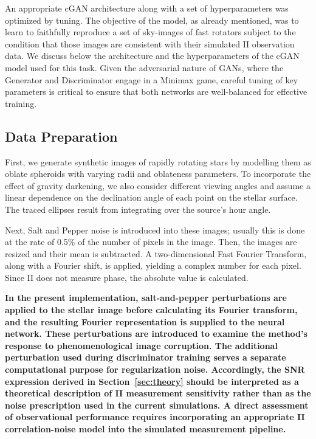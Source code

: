 An appropriate cGAN architecture along with a set of hyperparameters was optimized by tuning. The objective of the model, as already mentioned, was to learn to faithfully reproduce a set of sky-images of fast rotators subject to the condition that those images are consistent with their simulated II observation data. We discuss below the architecture and the hyperparameters of the cGAN model used for this task. Given the adversarial nature of GANs, where the Generator and Discriminator engage in a Minimax game, careful tuning of key parameters is critical to ensure that both networks are well-balanced for effective training.


\subsection{Data Preparation}\label{sec:DataPrep}
First, we generate synthetic images of rapidly rotating stars by modelling them as oblate spheroids with varying radii and oblateness parameters. To incorporate the effect of gravity darkening, we also consider different viewing angles and assume a linear dependence on the declination angle of each point on the stellar surface. The traced ellipses result from integrating over the source's hour angle.

Next, Salt and Pepper noise is introduced into these images; usually this is done at the rate of 0.5\% of the number of pixels in the image. Then, the images are resized and their mean is subtracted. A two-dimensional Fast Fourier Transform, along with a Fourier shift, is applied, yielding a complex number for each pixel. Since II does not measure phase, the absolute value is calculated.

{\bf In the present implementation, salt-and-pepper perturbations are applied to the stellar image before calculating its Fourier transform, and the resulting Fourier representation is supplied to the neural network. These perturbations are introduced to examine the method's response to phenomenological image corruption. The additional perturbation used during discriminator training serves a separate computational purpose for regularization noise. Accordingly, the SNR expression derived in Section~\ref{sec:theory} should be interpreted as a theoretical description of II measurement sensitivity rather than as the noise prescription used in the current simulations. A direct assessment of observational performance requires incorporating an appropriate II correlation-noise model into the simulated measurement pipeline.}

